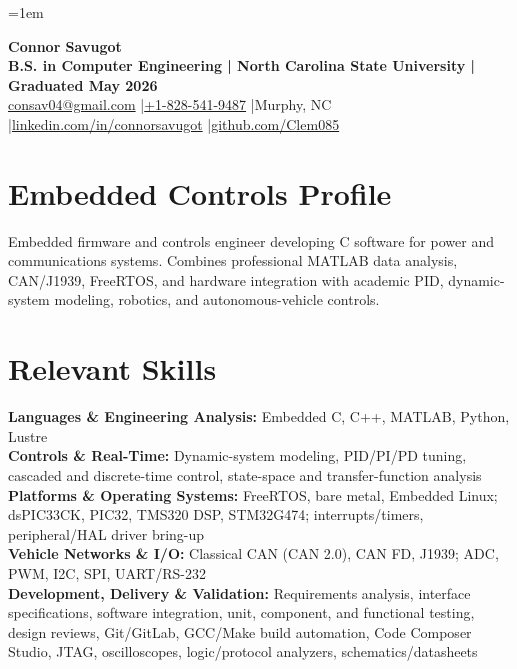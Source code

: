 \documentclass[10pt,letterpaper]{article}
\begin{document}
\fontsize{10.00}{11.00}\selectfont
\setlength{\RaggedRightRightskip}{0pt plus 5em}
\RaggedRight
\emergencystretch=1em

\begin{center}
  {\fontsize{21.5}{22.2}\selectfont\bfseries Connor Savugot}\\[1.5pt]
  {\bfseries B.S. in Computer Engineering | North Carolina State University | Graduated May 2026}\\[1.5pt]
  {\fontsize{9.6}{10.2}\selectfont
    \href{mailto:consav04@gmail.com}{consav04@gmail.com}
    \enspace|\enspace \href{tel:+18285419487}{+1-828-541-9487}
    \enspace|\enspace Murphy, NC
    \enspace|\enspace \href{https://linkedin.com/in/connorsavugot}{linkedin.com/in/connorsavugot}
    \enspace|\enspace \href{https://github.com/Clem085}{github.com/Clem085}}
\end{center}
\vspace{-0.18cm}

\section{Embedded Controls Profile}
Embedded firmware and controls engineer developing C software for power and communications systems. Combines professional MATLAB data analysis, CAN/J1939, FreeRTOS, and hardware integration with academic PID, dynamic-system modeling, robotics, and autonomous-vehicle controls.

\section{Relevant Skills}
\textbf{Languages \& Engineering Analysis:} Embedded C, C++, MATLAB, Python, Lustre\\
\textbf{Controls \& Real-Time:} Dynamic-system modeling, PID/PI/PD tuning, cascaded and discrete-time control, state-space and transfer-function analysis\\
\textbf{Platforms \& Operating Systems:} FreeRTOS, bare metal, Embedded Linux; dsPIC33CK, PIC32, TMS320 DSP, STM32G474; interrupts/timers, peripheral/HAL driver bring-up\\
\textbf{Vehicle Networks \& I/O:} Classical CAN (CAN 2.0), CAN FD, J1939; ADC, PWM, I2C, SPI, UART/RS-232\\
\textbf{Development, Delivery \& Validation:} Requirements analysis, interface specifications, software integration, unit, component, and functional testing, design reviews, Git/GitLab, GCC/Make build automation, Code Composer Studio, JTAG, oscilloscopes, logic/protocol analyzers, schematics/datasheets
\end{document}
